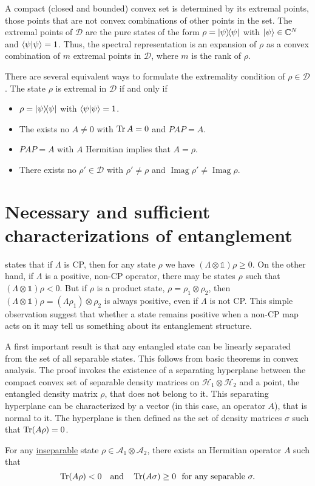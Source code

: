 \documentclass[12pt]{report}
\DeclareMathOperator{\Imag}{Imag}
\begin{document}
A compact (closed and bounded) convex set is determined by its extremal points,
those points that are not convex combinations of other points in the set.
The extremal points of $\mathcal D$ are the pure states of the form
$\rho=\ketbra\psi$ with $\ket\psi\in\mathbb C^N$ and $\braket\psi=1$.
Thus, the spectral representation is an expansion of $\rho$ as a convex combination of $m$ extremal points in $\mathcal D$, where $m$ is the rank of $\rho$.

There are several equivalent ways to formulate the extremality condition of $\rho \in\mathcal D$.
The state $\rho$ is extremal in $\mathcal D$ if and only if
\begin{itemize}
	\item $\rho = \ketbra\psi$ with $\braket\psi=1$.
	\item The exists no $A\neq 0$ with $\Tr A=0$ and $PAP=A$.
	\item $PAP=A$ with $A$ Hermitian implies that $A=\rho$.
	\item There exists no $\rho'\in\mathcal D$ with $\rho'\neq\rho$ and $\Imag\rho'\neq\Imag\rho$.
\end{itemize}

\section{Necessary and sufficient characterizations of entanglement}
 states that if $\Lambda$ is \ac{CP},
then for any state $\rho$ we have $(\Lambda \otimes \mathds1)\rho \ge 0$.
On the other hand, if $\Lambda$ is a positive, non-\ac{CP} operator, there may be states $\rho$ such that
$(\Lambda \otimes \mathds1)\rho < 0$.
But if $\rho$ is a product state, $\rho = \rho_1 \otimes \rho_2$, then
$(\Lambda \otimes \mathds1)\rho = (\Lambda \rho_1) \otimes \rho_2$ is always positive,
even if $\Lambda$ is not \ac{CP}.
This simple observation suggest that whether a state remains positive when a non-\ac{CP} map acts on it may tell us something about its entanglement structure.

A first important result is that any entangled state can be linearly separated from the set of all separable states.
This follows from basic theorems in convex analysis.
The proof invokes the existence of a separating hyperplane between the compact convex set of separable density matrices on $\mathcal H_1 \otimes \mathcal H_2$ and a point,
the entangled density matrix $\rho$,
that does not belong to it.
This separating hyperplane can be characterized by a vector (in this case, an operator $A$),
that is normal to it.
The hyperplane is then defined as the set of density matrices $\sigma$ such that
$\Tr(A\rho) = 0$.
\begin{thm}
	For any \uline{inseparable} state $\rho \in \mathcal A_1 \otimes \mathcal A_2$,
	there exists an Hermitian operator $A$ such that
	\begin{equation}
		\Tr(A\rho) < 0
		\quad \text{and} \quad
		\Tr(A\sigma) \ge 0
		\,\, \text{ for any separable }\sigma.
	\end{equation}
\end{thm}
\end{document}
